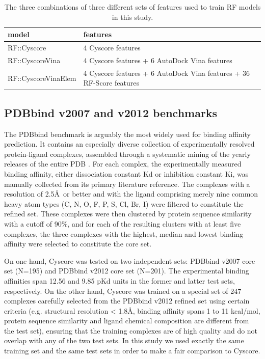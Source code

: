 \documentclass[journal=jacsat,manuscript=article]{achemso}
\begin{document}
\begin{table}[h]
\caption{The three combinations of three different sets of features used to train RF models in this study.}
\label{tbl:features}
\begin{tabular}{ll}
\hline
model & features\\
\hline
RF::Cyscore         & 4 Cyscore features\\
RF::CyscoreVina     & 4 Cyscore features + 6 AutoDock Vina features\\
RF::CyscoreVinaElem & 4 Cyscore features + 6 AutoDock Vina features + 36 RF-Score features\\
\hline
\end{tabular}
\end{table}

\subsection{PDBbind v2007 and v2012 benchmarks}

The PDBbind benchmark is arguably the most widely used for binding affinity prediction. It contains an especially diverse collection of experimentally resolved protein-ligand complexes, assembled through a systematic mining of the yearly releases of the entire PDB \cite{540,537}. For each complex, the experimentally measured binding affinity, either dissociation constant Kd or inhibition constant Ki, was manually collected from its primary literature reference. The complexes with a resolution of 2.5\AA\ or better and with the ligand comprising merely nine common heavy atom types (C, N, O, F, P, S, Cl, Br, I) were filtered to constitute the refined set. These complexes were then clustered by protein sequence similarity with a cutoff of 90\%, and for each of the resulting clusters with at least five complexes, the three complexes with the highest, median and lowest binding affinity were selected to constitute the core set.

On one hand, Cyscore was tested on two independent sets: PDBbind v2007 core set (N=195) and PDBbind v2012 core set (N=201). The experimental binding affinities span 12.56 and 9.85 pKd units in the former and latter test sets, respectively. On the other hand, Cyscore was trained on a special set of 247 complexes carefully selected from the PDBbind v2012 refined set using certain criteria \cite{1372} (e.g. structural resolution < 1.8\AA, binding affinity spans 1 to 11 kcal/mol, protein sequence similarity and ligand chemical composition are different from the test set), ensuring that the training complexes are of high quality and do not overlap with any of the two test sets. In this study we used exactly the same training set and the same test sets in order to make a fair comparison to Cyscore.
\end{document}
